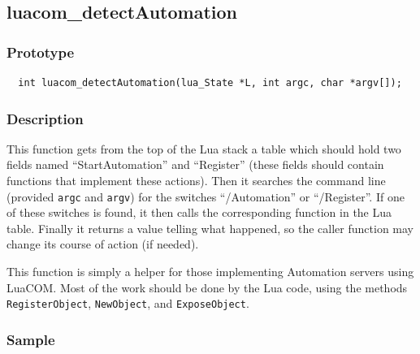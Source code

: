 \documentclass[11pt,a4paper,english]{report}
\newcommand{\techname}[1]{\mbox{#1}}
\newcommand{\luacom}{\techname{LuaCOM}}
\begin{document}
\subsection*{luacom\_detectAutomation}

\subsubsection*{Prototype}

\begin{verbatim}
  int luacom_detectAutomation(lua_State *L, int argc, char *argv[]);
\end{verbatim}

\subsubsection*{Description}
This function gets from the top of the Lua stack a table which should
hold two fields named ``StartAutomation'' and ``Register'' (these
fields should contain functions that implement these actions). Then it
searches the command line (provided \texttt{argc} and \texttt{argv})
for the switches ``/Automation'' or ``/Register''. If one of these
switches is found, it then calls the corresponding function in the Lua
table. Finally it returns a value telling what happened, so the caller
function may change its course of action (if needed).

This function is simply a helper for those implementing Automation
servers using \luacom. Most of the work should be done by the Lua
code, using the methods \verb+RegisterObject+,
\verb+NewObject+, and \verb+ExposeObject+.

\subsubsection*{Sample}
\end{document}

